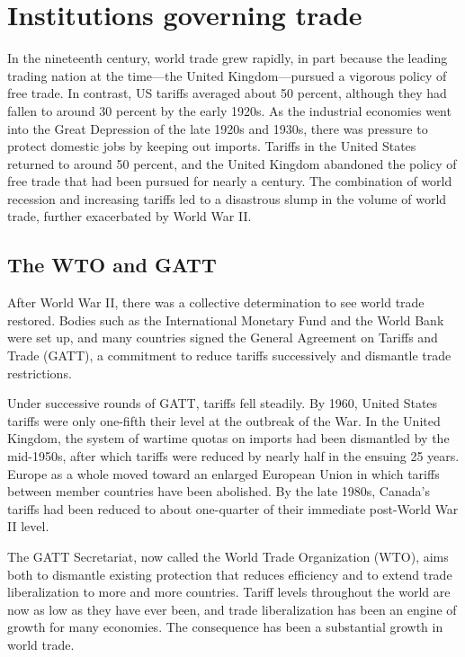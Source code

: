 \section{Institutions governing trade}\label{sec:ch15sec7}

In the nineteenth century, world trade grew rapidly, in part because the
leading trading nation at the time---the United Kingdom---pursued a vigorous
policy of free trade. In contrast, US tariffs averaged about 50 percent,
although they had fallen to around 30 percent by the early 1920s. As the
industrial economies went into the Great Depression of the late 1920s and
1930s, there was pressure to protect domestic jobs by keeping out imports.
Tariffs in the United States returned to around 50 percent, and the United
Kingdom abandoned the policy of free trade that had been pursued for nearly
a century. The combination of world recession and increasing tariffs led to
a disastrous slump in the volume of world trade, further exacerbated by
World War II.

\subsection*{The WTO and GATT}

After World War II, there was a collective determination to see world trade
restored. Bodies such as the International Monetary Fund and the World Bank
were set up, and many countries signed the General Agreement on Tariffs and
Trade (GATT), a commitment to reduce tariffs successively and dismantle
trade restrictions.

Under successive rounds of GATT, tariffs fell steadily. By 1960, United
States tariffs were only one-fifth their level at the outbreak of the War.
In the United Kingdom, the system of wartime quotas on imports had been
dismantled by the mid-1950s, after which tariffs were reduced by nearly half
in the ensuing 25 years. Europe as a whole moved toward an enlarged European
Union in which tariffs between member countries have been abolished. By the
late 1980s, Canada's tariffs had been reduced to about one-quarter of their
immediate post-World War II level.

The GATT Secretariat, now called the World Trade Organization (WTO), aims
both to dismantle existing protection that reduces efficiency and to extend
trade liberalization to more and more countries. Tariff levels throughout
the world are now as low as they have ever been, and trade liberalization
has been an engine of growth for many economies. The consequence has been a
substantial growth in world trade.

